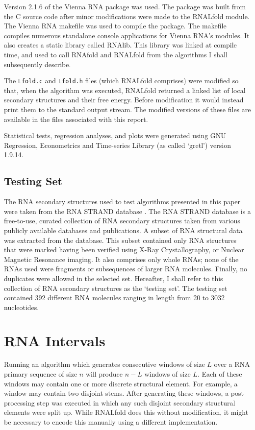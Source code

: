 \documentclass{cshonours}
\begin{document}
Version 2.1.6 of the Vienna RNA package was used. The package was built from the C source code after minor modifications were made to the RNALfold module. The Vienna RNA makefile was used to compile the package. The makefile compiles numerous standalone console applications for Vienna RNA's modules. It also creates a static library called RNAlib. This library was linked at compile time, and used to call RNAfold and RNALfold from the algorithms I shall subsequently describe.

The \texttt{Lfold.c} and \texttt{Lfold.h} files (which RNALfold comprises) were modified so that, when the algorithm was executed, RNALfold returned a linked list of local secondary structures and their free energy. Before modification it would instead print them to the standard output stream. The modified versions of these files are available in the files associated with this report.

Statistical tests, regression analyses, and plots were generated using GNU Regression, Econometrics and Time-series Library (as called `gretl') version 1.9.14.


\subsection{Testing Set}
The RNA secondary structures used to test algorithms presented in this paper were taken from the RNA STRAND database \cite{andronescu2008rna}. The RNA STRAND database is a free-to-use, curated collection of RNA secondary structures taken from various publicly available databases and publications. A subset of RNA structural data was extracted from the database. This subset contained only RNA structures that were marked having been verified using X-Ray Crystallography, or Nuclear Magnetic Resonance imaging. It also comprises only whole RNAs; none of the RNAs used were fragments or subsequences of larger RNA molecules. Finally, no duplicates were allowed in the selected set. Hereafter, I shall refer to this collection of RNA secondary structures as the `testing set'. The testing set contained 392 different RNA molecules ranging in length from 20 to 3032 nucleotides.


\section{RNA Intervals}
Running an algorithm which generates consecutive windows of size $L$ over a RNA primary sequence of size $n$ will produce $n-L$ windows of size $L$. Each of these windows may contain one or more discrete structural element. For example, a window may contain two disjoint stems. After generating these windows, a post-processing step was executed in which any such disjoint secondary structural elements were split up. While RNALfold does this without modification, it might be necessary to encode this manually using a different implementation.
\end{document}
